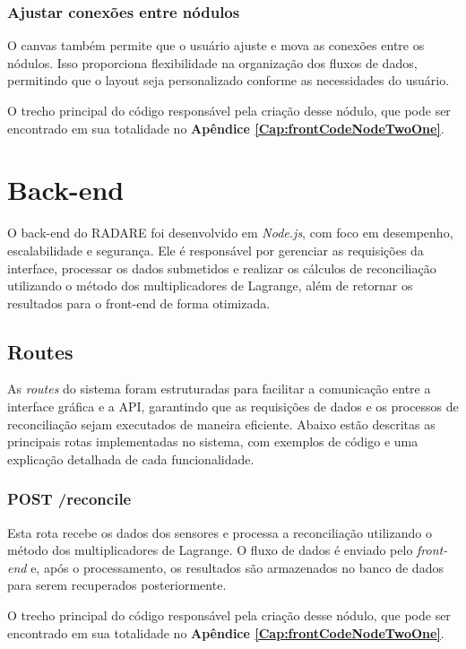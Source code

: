 \subsubsection{Ajustar conexões entre nódulos}

O canvas também permite que o usuário ajuste e mova as conexões entre os nódulos. Isso proporciona flexibilidade na organização dos fluxos de dados, permitindo que o layout seja personalizado conforme as necessidades do usuário.

O trecho principal do código responsável pela criação desse nódulo, que pode ser encontrado em sua totalidade no \textbf{Apêndice \ref{Cap:frontCodeNodeTwoOne}}.

\section{Back-end}

O back-end do RADARE foi desenvolvido em \textit{Node.js}, com foco em desempenho, escalabilidade e segurança. Ele é responsável por gerenciar as requisições da interface, processar os dados submetidos e realizar os cálculos de reconciliação utilizando o método dos multiplicadores de Lagrange, além de retornar os resultados para o front-end de forma otimizada.

\subsection{Routes}

As \textit{routes} do sistema foram estruturadas para facilitar a comunicação entre a interface gráfica e a API, garantindo que as requisições de dados e os processos de reconciliação sejam executados de maneira eficiente. Abaixo estão descritas as principais rotas implementadas no sistema, com exemplos de código e uma explicação detalhada de cada funcionalidade.

\subsubsection{POST /reconcile}

Esta rota recebe os dados dos sensores e processa a reconciliação utilizando o método dos multiplicadores de Lagrange. O fluxo de dados é enviado pelo \textit{front-end} e, após o processamento, os resultados são armazenados no banco de dados para serem recuperados posteriormente.

O trecho principal do código responsável pela criação desse nódulo, que pode ser encontrado em sua totalidade no \textbf{Apêndice \ref{Cap:frontCodeNodeTwoOne}}.

